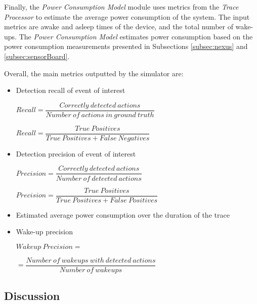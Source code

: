 Finally, the \textit{Power Consumption Model} module uses metrics from the \textit{Trace Processor} to estimate the average power consumption of the system. The input metrics are awake and asleep times of the device, and the total number of wake-ups. The \textit{Power Consumption Model} estimates power consumption based on the power consumption measurements presented in Subsections \ref{subsec:nexus} and \ref{subsec:sensorBoard}.

Overall, the main metrics outputted by the simulator are:



\begin{itemize}
\setlength{\itemsep}{+5pt}  

\item Detection recall of event of interest

$Recall = \dfrac{Correctly\:detected\:actions}{Number\:of\:actions\:in\:ground\:truth}$

$Recall = \dfrac{True\:Positives}{True\:Positives + False\:Negatives}$\linebreak[2]


\item Detection precision of event of interest

$Precision = \dfrac{Correctly\:detected\:actions}{Number\:of\:detected\:actions}$

$Precision = \dfrac{True\:Positives}{True\:Positives + False\:Positives}$\linebreak[2]


\item Estimated average power consumption over the duration of the trace


\item Wake-up precision

$Wakeup\:Precision = $

$ = \dfrac{Number\:of\:wakeups\:with\:detected\:actions}{Number\:of\:wakeups}$\linebreak[2]

\end{itemize}



\subsection{Discussion}
\label{subsec:discussion}

